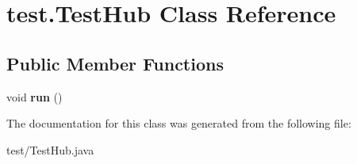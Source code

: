 \hypertarget{classtest_1_1_test_hub}{
\section{test.\-Test\-Hub \-Class \-Reference}
\label{classtest_1_1_test_hub}
}
\subsection*{\-Public \-Member \-Functions}
\begin{DoxyCompactItemize}
\item 
\hypertarget{classtest_1_1_test_hub_a1a10f13455ac2853f4965029726a8419}{
void {\bfseries run} ()}
\label{classtest_1_1_test_hub_a1a10f13455ac2853f4965029726a8419}

\end{DoxyCompactItemize}


\-The documentation for this class was generated from the following file\-:\begin{DoxyCompactItemize}
\item 
test/\-Test\-Hub.\-java\end{DoxyCompactItemize}
